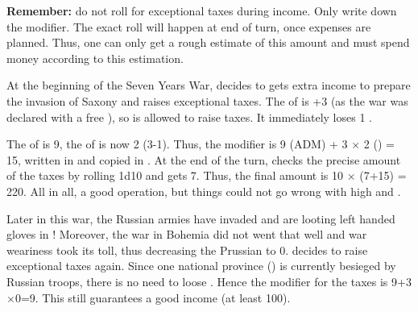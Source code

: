 \aparag \textbf{Remember:} do not roll for exceptional taxes during
income. Only write down the modifier. The exact roll will happen at end of
turn, once expenses are planned. Thus, one can only get a rough estimate of
this amount and must spend money according to this estimation.

\begin{exemple}
  At the beginning of the Seven Years War,  decides to
  gets extra income to prepare the invasion of Saxony and raises exceptional
  taxes. The \STAB of \PRU is +3 (as the war was declared with a free \CB), so
  \PRU is allowed to raise taxes. It immediately loses 1 \STAB.

  The \ADM of  is 9, the \STAB of \PRU is now 2
  (3-1). Thus, the modifier is 9 (ADM) + 3 $\times$ 2 (\STAB) = 15, written in
   and copied in
  . At the end of the turn, \PRU
  checks the precise amount of the taxes by rolling 1d10 and gets 7. Thus, the
  final amount is 10 $\times$ (7+15) = 220\ducats. All in all, a good
  operation, but things could not go wrong with high \STAB and \ADM.

  \smallskip

  Later in this war, the Russian armies have invaded \provinceBrandenburg and
  are looting left handed gloves in \villeBerlin! Moreover, the war in Bohemia
  did not went that well and war weariness took its toll, thus decreasing the
  Prussian \STAB to 0.  decides to raise exceptional
  taxes again. Since one national province (\provinceBrandenburg) is currently
  besieged by Russian troops, there is no need to loose \STAB. Hence the
  modifier for the taxes is 9+3$\times$0=9. This still guarantees a good
  income (at least 100\ducats).
\end{exemple}

